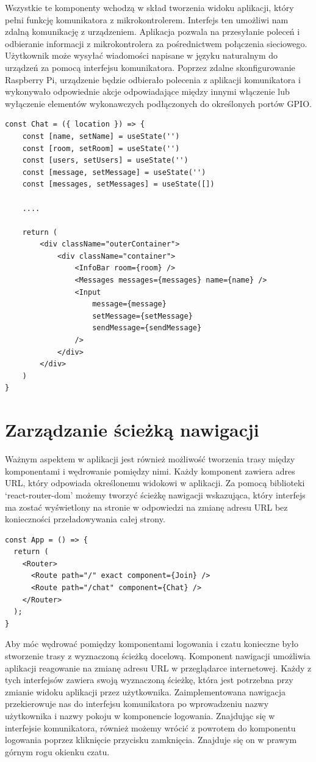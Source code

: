 Wszystkie te komponenty wchodzą w skład tworzenia widoku aplikacji, który pełni funkcję komunikatora z mikrokontrolerem. Interfejs ten umożliwi nam zdalną komunikację z urządzeniem. Aplikacja pozwala na przesyłanie poleceń i odbieranie informacji z mikrokontrolera za pośrednictwem połączenia sieciowego. Użytkownik może wysyłać wiadomości napisane w języku naturalnym do urządzeń za pomocą interfejsu komunikatora. Poprzez zdalne skonfigurowanie Raspberry Pi, urządzenie będzie odbierało polecenia z aplikacji komunikatora i wykonywało odpowiednie akcje odpowiadające między innymi włączenie lub wyłączenie elementów wykonawczych podłączonych do określonych portów GPIO.
\begin{lstlisting}[caption=Implementacja komponentu czatu]
const Chat = ({ location }) => {
    const [name, setName] = useState('')
    const [room, setRoom] = useState('')
    const [users, setUsers] = useState('')
    const [message, setMessage] = useState('')
    const [messages, setMessages] = useState([])

	....	

    return (
        <div className="outerContainer">
            <div className="container">
                <InfoBar room={room} />
                <Messages messages={messages} name={name} />
                <Input
                    message={message}
                    setMessage={setMessage}
                    sendMessage={sendMessage}
                />
            </div>
        </div>
    )
}
\end{lstlisting}
\section{Zarządzanie ścieżką nawigacji}
Ważnym aspektem w aplikacji jest również możliwość tworzenia trasy między komponentami i wędrowanie pomiędzy nimi. Każdy komponent zawiera adres URL, który odpowiada określonemu widokowi w aplikacji. Za pomocą biblioteki ‘react-router-dom’ możemy tworzyć ścieżkę nawigacji wskazująca, który interfejs ma zostać wyświetlony na stronie w odpowiedzi na zmianę adresu URL bez konieczności przeładowywania całej strony.
\begin{lstlisting}[caption=Implementacja sciezki nawigacji pomiedzy interfejsami]
const App = () => {
  return (
    <Router>
      <Route path="/" exact component={Join} />
      <Route path="/chat" component={Chat} />
    </Router>
  );
}
\end{lstlisting}
Aby móc wędrować pomiędzy komponentami logowania i czatu konieczne było stworzenie trasy z wyznaczoną ścieżką docelową. Komponent nawigacji umożliwia aplikacji reagowanie na zmianę adresu URL w przeglądarce internetowej. Każdy z tych interfejsów zawiera swoją wyznaczoną ścieżkę, która jest potrzebna przy zmianie widoku aplikacji przez użytkownika. Zaimplementowana nawigacja przekierowuje nas do interfejsu komunikatora po wprowadzeniu nazwy użytkownika i nazwy pokoju w komponencie logowania. Znajdując się w interfejsie komunikatora, również możemy wrócić z powrotem do komponentu logowania poprzez kliknięcie przycisku zamknięcia. Znajduje się on w prawym górnym rogu okienku czatu.
